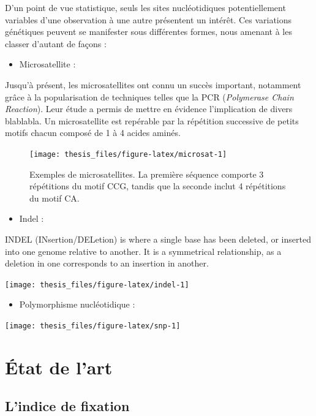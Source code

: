 \documentclass[12pt,twoside]{ugathesis}
\providecommand{\tightlist}{%
  \setlength{\itemsep}{0pt}\setlength{\parskip}{0pt}}
\begin{document}
D'un point de vue statistique, seuls les sites nucléotidiques
potentiellement variables d'une observation à une autre présentent un
intérêt. Ces variations génétiques peuvent se manifester sous
différentes formes, nous amenant à les classer d'autant de façons :
\begin{itemize}
\tightlist
\item
  Microsatellite :
\end{itemize}
Jusqu'à présent, les microsatellites ont connu un succès important,
notamment grâce à la popularisation de techniques telles que la PCR
(\emph{Polymerase Chain Reaction}). Leur étude a permis de mettre en
évidence l'implication de divers blablabla. Un microsatellite est
repérable par la répétition successive de petits motifs chacun composé
de 1 à 4 acides aminés.




\begin{figure}

{\centering \texttt{[image: thesis\_files/figure-latex/microsat-1]} 

}

\caption{Exemples de microsatellites. La première séquence
comporte 3 répétitions du motif CCG, tandis que la seconde inclut 4
répétitions du motif CA.}\label{fig:microsat}
\end{figure}
\begin{itemize}
\tightlist
\item
  Indel :
\end{itemize}
INDEL (INsertion/DELetion) is where a single base has been deleted, or
inserted into one genome relative to another. It is a symmetrical
relationship, as a deletion in one corresponds to an insertion in
another.
\begin{center}\texttt{[image: thesis\_files/figure-latex/indel-1]} \end{center}
\begin{itemize}
\tightlist
\item
  Polymorphisme nucléotidique :
\end{itemize}
\begin{center}\texttt{[image: thesis\_files/figure-latex/snp-1]} \end{center}

\chapter{État de l'art}\label{etat-de-lart}

\section{L'indice de fixation}\label{lindice-de-fixation}
\end{document}
